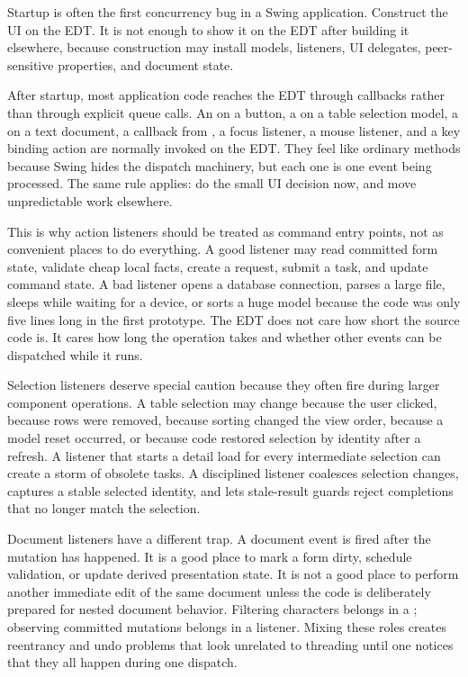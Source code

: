 Startup is often the first concurrency bug in a Swing application. Construct the UI on the EDT. It is not enough to show it on the EDT after building it elsewhere, because construction may install models, listeners, UI delegates, peer-sensitive properties, and document state.

After startup, most application code reaches the EDT through callbacks rather than through explicit queue calls. An  on a button, a  on a table selection model, a  on a text document, a  callback from , a focus listener, a mouse listener, and a key binding action are normally invoked on the EDT. They feel like ordinary methods because Swing hides the dispatch machinery, but each one is one event being processed. The same rule applies: do the small UI decision now, and move unpredictable work elsewhere.

This is why action listeners should be treated as command entry points, not as convenient places to do everything. A good listener may read committed form state, validate cheap local facts, create a request, submit a task, and update command state. A bad listener opens a database connection, parses a large file, sleeps while waiting for a device, or sorts a huge model because the code was only five lines long in the first prototype. The EDT does not care how short the source code is. It cares how long the operation takes and whether other events can be dispatched while it runs.

Selection listeners deserve special caution because they often fire during larger component operations. A table selection may change because the user clicked, because rows were removed, because sorting changed the view order, because a model reset occurred, or because code restored selection by identity after a refresh. A listener that starts a detail load for every intermediate selection can create a storm of obsolete tasks. A disciplined listener coalesces selection changes, captures a stable selected identity, and lets stale-result guards reject completions that no longer match the selection.

Document listeners have a different trap. A document event is fired after the mutation has happened. It is a good place to mark a form dirty, schedule validation, or update derived presentation state. It is not a good place to perform another immediate edit of the same document unless the code is deliberately prepared for nested document behavior. Filtering characters belongs in a ; observing committed mutations belongs in a listener. Mixing these roles creates reentrancy and undo problems that look unrelated to threading until one notices that they all happen during one dispatch.

